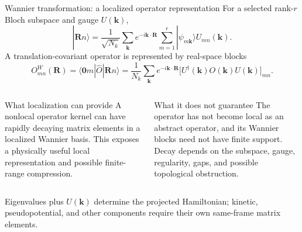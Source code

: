 \documentclass[aspectratio=169,10pt]{beamer}
\begin{document}
\begin{frame}{Wannier transformation: a localized operator representation}
  \small
  For a selected rank-$r$ Bloch subspace and gauge $U(\mathbf k)$,
  \[
    |\mathbf R n\rangle
      =\frac{1}{\sqrt{N_k}}\sum_{\mathbf k}e^{-i\mathbf k\cdot\mathbf R}
       \sum_{m=1}^{r}|\psi_{m\mathbf k}\rangle U_{mn}(\mathbf k).
  \]
  A translation-covariant operator is represented by real-space blocks
  \[
    O^W_{mn}(\mathbf R)
      =\langle\mathbf 0m|\hat O|\mathbf Rn\rangle
      =\frac{1}{N_k}\sum_{\mathbf k}e^{-i\mathbf k\cdot\mathbf R}
       \bigl[U^\dagger(\mathbf k)O(\mathbf k)U(\mathbf k)\bigr]_{mn}.
  \]
  \begin{columns}[T]
      \begin{block}{What localization can provide}
        A nonlocal operator kernel can have rapidly decaying matrix elements in a
        localized Wannier basis. This exposes a physically useful local representation
        and possible finite-range compression.
      \end{block}
      \begin{alertblock}{What it does not guarantee}
        The operator has not become local as an abstract operator, and its Wannier
        blocks need not have finite support. Decay depends on the subspace, gauge,
        regularity, gaps, and possible topological obstruction.
      \end{alertblock}
  \end{columns}

  \centering
  Eigenvalues plus $U(\mathbf k)$ determine the projected Hamiltonian; kinetic,
  pseudopotential, and other components require their own same-frame matrix elements.
\end{frame}
\end{document}

